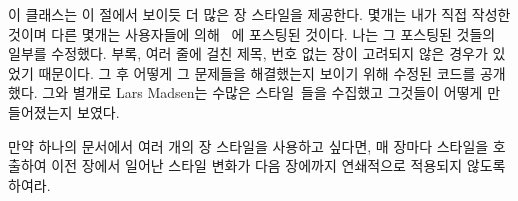 이 클래스는 이 절에서 보이듯 더 많은 장 스타일을 제공한다.
몇개는 내가 직접 작성한 것이며 다른 몇개는  사용자들에
의해 \ctt\ 에 포스팅된 것이다.
나는 그 포스팅된 것들의 일부를 수정했다.
부록, 여러 줄에 걸친 제목, 번호 없는 장이 고려되지 않은 경우가 있었기 때문이다.
그 후 어떻게 그 문제들을 해결했는지 보이기 위해 수정된 코드를 공개했다. 
그와 별개로 Lars Madsen는 
수많은 스타일~\cite{CHAPSTYLES}들을 수집했고 그것들이 어떻게 만들어졌는지 보였다.


만약 하나의 문서에서 여러 개의 장 스타일을 사용하고 싶다면,
매 장마다  스타일을 호출하여 이전 장에서 일어난 스타일 변화가
다음 장에까지 연쇄적으로 적용되지 않도록 하여라.



\newcommand\PScaveat[1]{
  \smallskip\noindent
  \textbf{Caveat:} The \Pcstyle{#1} style requires the
\Lpack{graphicx} package.
\smallskip
}


